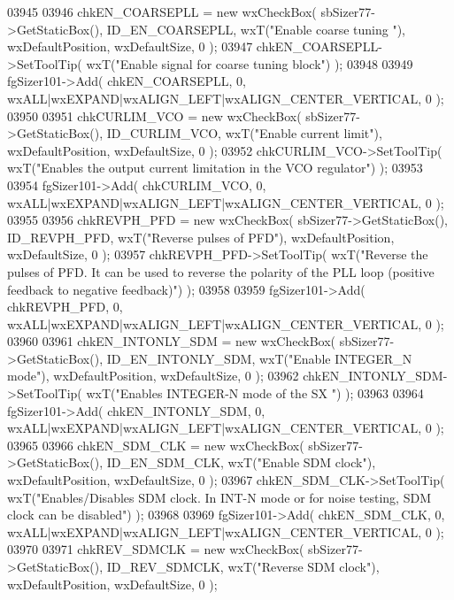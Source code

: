 \begin{DoxyCode}
03945     
03946     chkEN_COARSEPLL = \textcolor{keyword}{new} wxCheckBox( sbSizer77->GetStaticBox(), ID_EN_COARSEPLL, wxT(\textcolor{stringliteral}{"Enable coarse tuning
      "}), wxDefaultPosition, wxDefaultSize, 0 );
03947     chkEN_COARSEPLL->SetToolTip( wxT(\textcolor{stringliteral}{"Enable signal for coarse tuning block"}) );
03948     
03949     fgSizer101->Add( chkEN_COARSEPLL, 0, wxALL|wxEXPAND|wxALIGN\_LEFT|wxALIGN\_CENTER\_VERTICAL, 0 );
03950     
03951     chkCURLIM_VCO = \textcolor{keyword}{new} wxCheckBox( sbSizer77->GetStaticBox(), ID_CURLIM_VCO, wxT(\textcolor{stringliteral}{"Enable current limit"}), 
      wxDefaultPosition, wxDefaultSize, 0 );
03952     chkCURLIM_VCO->SetToolTip( wxT(\textcolor{stringliteral}{"Enables the output current limitation in the VCO regulator"}) );
03953     
03954     fgSizer101->Add( chkCURLIM_VCO, 0, wxALL|wxEXPAND|wxALIGN\_LEFT|wxALIGN\_CENTER\_VERTICAL, 0 );
03955     
03956     chkREVPH_PFD = \textcolor{keyword}{new} wxCheckBox( sbSizer77->GetStaticBox(), ID_REVPH_PFD, wxT(\textcolor{stringliteral}{"Reverse pulses of PFD"}), 
      wxDefaultPosition, wxDefaultSize, 0 );
03957     chkREVPH_PFD->SetToolTip( wxT(\textcolor{stringliteral}{"Reverse the pulses of PFD. It can be used to reverse the polarity of the
       PLL loop (positive feedback to negative feedback)"}) );
03958     
03959     fgSizer101->Add( chkREVPH_PFD, 0, wxALL|wxEXPAND|wxALIGN\_LEFT|wxALIGN\_CENTER\_VERTICAL, 0 );
03960     
03961     chkEN_INTONLY_SDM = \textcolor{keyword}{new} wxCheckBox( sbSizer77->GetStaticBox(), 
      ID_EN_INTONLY_SDM, wxT(\textcolor{stringliteral}{"Enable INTEGER\_N mode"}), wxDefaultPosition, wxDefaultSize, 0 );
03962     chkEN_INTONLY_SDM->SetToolTip( wxT(\textcolor{stringliteral}{"Enables INTEGER-N mode of the SX "}) );
03963     
03964     fgSizer101->Add( chkEN_INTONLY_SDM, 0, wxALL|wxEXPAND|wxALIGN\_LEFT|wxALIGN\_CENTER\_VERTICAL, 0 );
03965     
03966     chkEN_SDM_CLK = \textcolor{keyword}{new} wxCheckBox( sbSizer77->GetStaticBox(), ID_EN_SDM_CLK, wxT(\textcolor{stringliteral}{"Enable SDM clock"}), 
      wxDefaultPosition, wxDefaultSize, 0 );
03967     chkEN_SDM_CLK->SetToolTip( wxT(\textcolor{stringliteral}{"Enables/Disables SDM clock. In INT-N mode or for noise testing, SDM
       clock can be disabled"}) );
03968     
03969     fgSizer101->Add( chkEN_SDM_CLK, 0, wxALL|wxEXPAND|wxALIGN\_LEFT|wxALIGN\_CENTER\_VERTICAL, 0 );
03970     
03971     chkREV_SDMCLK = \textcolor{keyword}{new} wxCheckBox( sbSizer77->GetStaticBox(), ID_REV_SDMCLK, wxT(\textcolor{stringliteral}{"Reverse SDM clock"}), 
      wxDefaultPosition, wxDefaultSize, 0 );

\end{DoxyCode}
